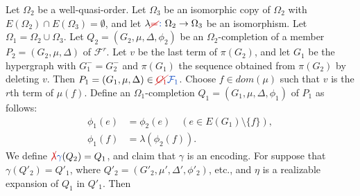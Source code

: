 Let $\Omega_2$ be a well-quasi-order. Let $\Omega_3$ be an isomorphic copy of $\Omega_2$ with $E(\Omega_2) \cap E(\Omega_3) = \emptyset$, and let $\lambda \delm{=}\fix{\colon} \Omega_2 \to \Omega_3$ be an isomorphism. Let $\Omega_1 = \Omega_2 \cup \Omega_3$. Let $Q_2 = (G_2, \mu, \Delta, \phi_2)$ be an $\Omega_2$-completion of a member $P_2 = (G_2, \mu, \Delta)$ of $\mathcal{F}^r$. Let $v$ be the last term of $\pi(G_2)$, and let $G_1$ be the hypergraph with $G_1^- = G_2^-$ and $\pi(G_1)$ the sequence obtained from $\pi(G_2)$ by deleting $v$. Then $P_1 = (G_1, \mu, \Delta) \in \delm{C_1}\fix{\mathcal{F}_1}$. Choose $f \in dom(\mu)$ such that $v$ is the $r$th term of $\mu(f)$. Define an $\Omega_1$-completion $Q_1 = (G_1, \mu, \Delta, \phi_1)$ of $P_1$ as follows:
\begin{align*}
\phi_1(e) &= \phi_2(e) \quad (e \in E(G_1) \setminus \{f\}), \\
\phi_1(f) &= \lambda(\phi_2(f)).
\end{align*}
We define $\delm{\lambda}\fix{\gamma}(Q_2) = Q_1$, and claim that $\gamma$ is an encoding. For suppose that $\gamma(Q'_2) = Q'_1$, where $Q'_2 = (G'_2, \mu', \Delta', \phi'_2)$, etc., and $\eta$ is a realizable expansion of $Q_1$ in $Q'_1$. Then
